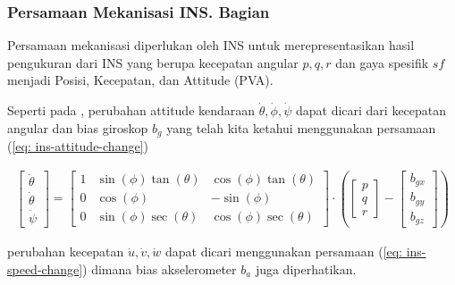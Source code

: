 \begin{frame}[allowframebreaks]
    \frametitle{Persamaan Mekanisasi INS. Bagian}
    
    Persamaan mekanisasi diperlukan oleh INS untuk merepresentasikan hasil pengukuran dari INS yang berupa kecepatan angular $p, q, r$ dan gaya spesifik $sf$ menjadi Posisi, Kecepatan, dan Attitude (PVA).

    Seperti pada \cite{nemra2010robust}, perubahan attitude kendaraan $\dot{\theta}, \dot{\phi}, \dot{\psi}$ dapat dicari dari kecepatan angular dan bias giroskop $b_g$ yang telah kita ketahui menggunakan persamaan (\ref{eq: ins-attitude-change})

    \begin{equation}
        \begin{array}{c}
        {\left[\begin{array}{l}
        \dot{\theta} \\
        \dot{\theta} \\
        \dot{\psi}
        \end{array}\right]=\left[\begin{array}{ccc}
        1 & \sin (\phi) \tan (\theta) & \cos (\phi) \tan (\theta) \\
        0 & \cos (\phi) & -\sin (\phi) \\
        0 & \sin (\phi) \sec (\theta) & \cos (\phi) \sec (\theta)
        \end{array}\right]}
        \cdot\left(\left[\begin{array}{l}
        p \\
        q \\
        r
        \end{array}\right]-\left[\begin{array}{c}
        b_{g x} \\
        b_{g y} \\
        b_{g z}
        \end{array}\right]\right)
        \end{array}
        \label{eq: ins-attitude-change}
    \end{equation}

    \pagebreak

    perubahan kecepatan $\dot{u}, \dot{v}, \dot{w}$ dapat dicari menggunakan persamaan (\ref{eq: ins-speed-change}) dimana bias akselerometer $b_a$ juga diperhatikan.


\end{frame}
